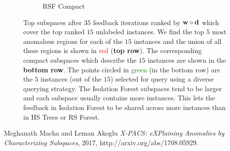 \documentclass{article} %
\begin{document}
\begin{figure}
\begin{subfigure}[b]{0.3\textwidth}
    	\caption{RSF Compact}
    	\label{fig:rsforest_compact_rects}
    \end{subfigure}
	\caption{Top subspaces after $35$ feedback iterations ranked by ${\bf w}\circ{\bf d}$ which cover the top ranked $15$ unlabeled instances. We find the top $5$ most anomalous regions for each of the $15$ instances and the union of all these regions is shown in \textcolor{red}{red} (\textbf{top row}). The corresponding compact subspaces which describe the $15$ instances are shown in the \textbf{bottom row}. The points circled in \textcolor{green}{green} (in the bottom row) are the $5$ instances (out of the $15$) selected for query using a diverse querying strategy. The Isolation Forest subspaces tend to be larger and each subspace usually contains more instances. This lets the feedback in Isolation Forest to be shared across more instances than in HS Trees or RS Forest.} \label{fig:tree_diffs}
\end{figure}

\begin{thebibliography}{1}
 Meghanath Macha and Leman Akoglu {\em {X-PACS:} eXPlaining Anomalies by Characterizing Subspaces},  2017, http://arxiv.org/abs/1708.05929.
\end{thebibliography}
\end{document}
